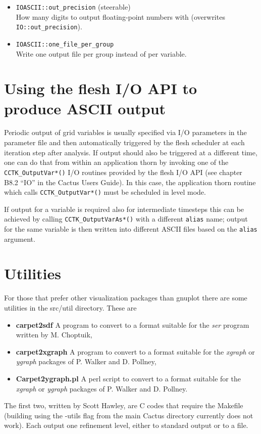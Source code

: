 \documentclass{article}
\begin{document}
\begin{itemize}
  \item {\tt IOASCII::out\_precision} (steerable)\\
        How many digits to output floating-point numbers with (overwrites
        {\tt IO::out\_precision}).

  \item {\tt IOASCII::one\_file\_per\_group}\\
        Write one output file per group instead of per variable.

\end{itemize}


\section{Using the flesh I/O API to produce ASCII output}

Periodic output of grid variables is usually specified via I/O parameters
in the parameter file and then automatically triggered by the flesh scheduler
at each iteration step after analysis. If output should also be triggered
at a different time, one can do that from within an application thorn by
invoking one of the {\tt CCTK\_OutputVar*()} I/O routines provided
by the flesh I/O API (see chapter B8.2 ``IO'' in the Cactus Users Guide).
In this case, the application thorn routine which calls {\tt CCTK\_OutputVar*()}
must be scheduled in level mode.

If output for a variable is required also for intermediate timesteps
this can be achieved by calling {\tt CCTK\_OutputVarAs*()} with a different
{\tt alias} name; output for the same variable is then written into
different ASCII files based on the {\tt alias} argument.


\section{Utilities}
\label{sec:utils}

For those that prefer other visualization packages than gnuplot there
are some utilities in the src/util directory. These are
\begin{itemize}
\item {\bf carpet2sdf} A program to convert to a format suitable for
  the {\it ser} program written by M. Choptuik,
\item {\bf carpet2xgraph} A program to convert to a format suitable
  for the {\it xgraph} or {\it ygraph} packages of P. Walker and D.
  Pollney,
\item {\bf Carpet2ygraph.pl} A perl script to convert to a format
  suitable for the {\it xgraph} or {\it ygraph} packages of P. Walker
  and D. Pollney.
\end{itemize}
The first two, written by Scott Hawley, are C codes that require the
Makefile (building using the -utils flag from the main Cactus
directory currently does not work). Each output one refinement level,
either to standard output or to a file.
\end{document}
